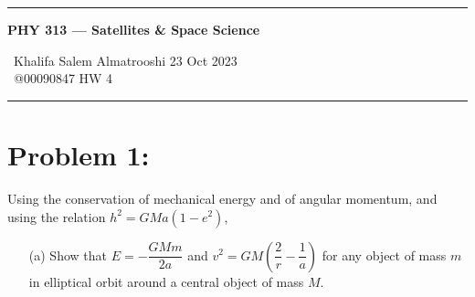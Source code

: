 \documentclass{article}
\begin{document}
	
	\begin{center}
		\hrule
		\vspace{0.4cm}
		{\textbf { \large PHY 313 --- Satellites \& Space Science}}
		\vspace{0.4cm}
	\end{center}
	{ \ Khalifa Salem Almatrooshi \hspace{\fill}  23 Oct 2023 \\
		{ } \ @00090847 \hspace{\fill}  HW 4 \\
		\hrule	

	\section*{Problem 1: }
	Using the conservation of mechanical energy and of angular momentum, and using the relation $h^2 = GMa(1-e^2)$, \\ 
	\begin{enumerate}
		\item[(a)] Show that $ E=-\dfrac{GMm}{2a}$ and $ v^2 = GM\left( \dfrac{2}{r} - \dfrac{1}{a} \right)$ for any object of mass $m$ in elliptical orbit around a central object of mass $M$.

\end{enumerate}}
\end{document}
